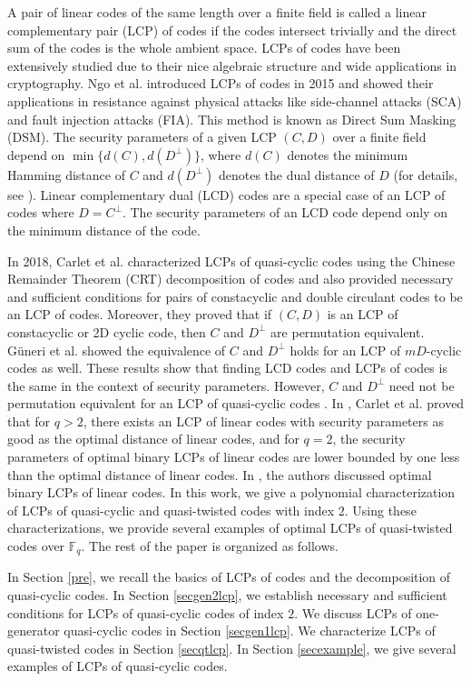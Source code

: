 \documentclass[12 pt]{extarticle}
\numberwithin{equation}{section}
\theoremstyle{definition}
\begin{document}
A pair of linear codes of the same length over a finite field is called a linear complementary pair (LCP) of codes if the codes intersect trivially and the direct sum of the codes is the whole ambient space. LCPs of codes have been extensively studied due to their nice algebraic structure and wide applications in cryptography. Ngo et al. \cite{Ngo2015} introduced LCPs of codes in 2015 and showed their applications in resistance against physical attacks like side-channel attacks (SCA) and fault injection attacks (FIA). This method is known as Direct Sum Masking (DSM). The security parameters of a given LCP  $(C,D)$ over a finite field depend on $\min \{d(C),d(D^\perp)\}$, where $d(C)$ denotes the minimum Hamming distance of  $C$ and $d(D^\perp)$ denotes the dual distance of $D$ (for details, see \cite{Carlet2016,carlet2018}). Linear complementary dual (LCD) codes are a special case of an LCP of codes where $D=C^{\perp}$. The security parameters of an LCD code depend only on the minimum distance of the code. 

In 2018, Carlet et al. \cite{carlet2018}
 characterized LCPs of quasi-cyclic codes using the  Chinese Remainder Theorem (CRT) decomposition of codes and also provided necessary and sufficient conditions for pairs of constacyclic and double circulant codes to be an LCP of codes. Moreover, they proved that if $(C, D)$ is an LCP of constacyclic or 2D cyclic code, then $C$ and $D^{\perp}$ are permutation equivalent. G\"uneri et al. \cite{Guneri2018} showed the equivalence of $C$ and $D^{\perp}$ holds for an LCP of  $mD$-cyclic codes as well. These results show that finding LCD codes and LCPs of codes is the same in the context of security parameters. However, $C$ and $D^\perp$ need not be permutation equivalent for an LCP of quasi-cyclic codes \cite[Example 3.3]{carlet2018}.  In \cite{carlet2019}, Carlet et al. proved that for $q>2$, there exists an LCP of linear codes with security parameters as good as the optimal distance of linear codes, and for $q=2$, the security parameters of optimal binary LCPs of linear codes are lower bounded by one less than the optimal distance of linear codes. In \cite{Choi2022,Guneri2023,Li2023}, the authors discussed optimal binary LCPs of linear codes. In this work, we give a polynomial characterization of  LCPs of quasi-cyclic and quasi-twisted codes with index $2$. Using these characterizations, we provide several examples of optimal LCPs of quasi-twisted codes over $\mathbb{F}_q$. The rest of the paper is organized as follows.

 In Section \ref{pre}, we recall the basics of LCPs of codes and the decomposition of quasi-cyclic codes. In Section \ref{secgen2lcp}, we establish necessary and sufficient conditions for LCPs of quasi-cyclic codes of index $2$. We discuss LCPs of one-generator quasi-cyclic codes in Section \ref{secgen1lcp}. We characterize LCPs of quasi-twisted codes in Section \ref{secqtlcp}. In Section \ref{secexample}, we give several examples of LCPs of quasi-cyclic codes.
\end{document}
